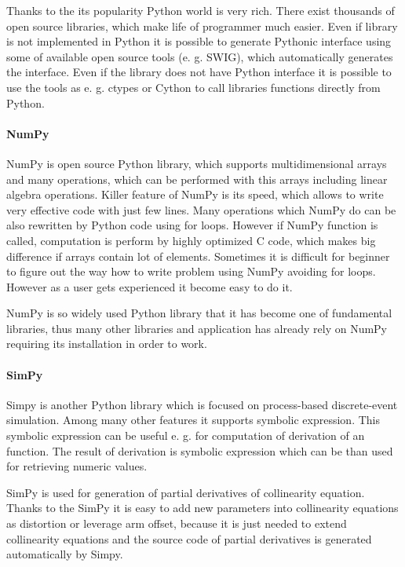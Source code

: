 \documentclass[a4paper,12pt]{article}
\begin{document}
Thanks to the its popularity Python world is very rich. There exist
thousands of open source libraries, which make life of programmer much easier. Even 
if library is not implemented in Python it is possible to generate Pythonic 
interface using some of available open source tools (e. g. SWIG), which automatically
generates the interface. Even if the library does not have Python interface it 
is possible to use the tools as e. g. ctypes or Cython to call libraries functions directly from Python.

\paragraph{NumPy}

NumPy is open source Python library, which supports multidimensional arrays and many operations, which can be
performed with this arrays including linear algebra operations. Killer feature of NumPy is its speed,
which allows to write very effective code with just few lines. Many operations which NumPy do can be 
also rewritten by Python code using  for loops. However if NumPy function is called,
computation is perform by highly optimized C code, which makes big difference if arrays contain 
lot of elements. Sometimes it is difficult for beginner to figure out the way how 
to write problem using NumPy avoiding for loops. However as a user gets experienced 
it become easy to do it. 

NumPy is so widely used Python library that it has become one of fundamental libraries, thus many
other libraries and application has already rely on NumPy requiring its installation in order to work.

\paragraph{SimPy}

Simpy is another Python library which is focused on process-based discrete-event simulation.
Among many other features it supports symbolic expression. This symbolic expression can be useful
e. g. for computation of derivation of an function. The result of derivation is symbolic expression which can 
be than used for retrieving numeric values. 

SimPy is used for generation of partial derivatives of collinearity equation. Thanks to the SimPy 
it is easy to add new parameters into collinearity equations as distortion or leverage arm offset,
because it is just needed to extend collinearity equations and the source code of partial derivatives 
is generated automatically by Simpy. 
\end{document}
